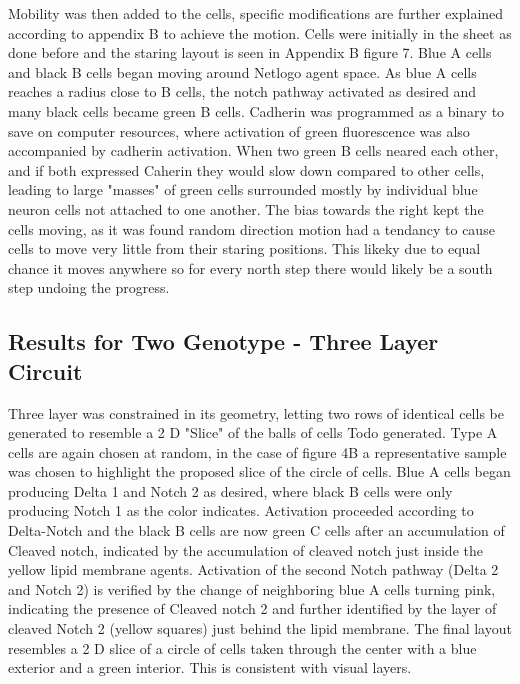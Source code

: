 \documentclass[12pt]{ifacconf}
\begin{document}
Mobility was then added to the cells, specific modifications are further explained according to appendix B to achieve the motion. Cells were initially in the sheet as done before and the staring layout is seen in Appendix B figure 7. Blue A cells and black B cells began moving around Netlogo agent space. As blue A cells reaches a radius close to B cells, the notch pathway activated as desired and many black cells became green B cells. Cadherin was programmed as a binary to save on computer resources, where activation of green fluorescence was also accompanied by cadherin activation. When two green B cells neared each other, and if both expressed Caherin they would slow down compared to other cells, leading to large "masses" of green cells surrounded mostly by individual blue neuron cells not attached to one another. The bias towards the right kept the cells moving, as it was found random direction motion had a tendancy to cause cells to move very little from their staring positions. This likeky due to equal chance it moves anywhere so for every north step there would likely be a south step undoing the progress. 

\subsection{Results for Two Genotype - Three Layer Circuit} 

Three layer was constrained in its geometry, letting two rows of identical cells be generated to resemble a 2 D "Slice" of the balls of cells Todo generated.  Type A cells are again chosen at random, in the case of figure 4B a representative sample was chosen to highlight the proposed slice of the circle of cells. Blue A cells began producing Delta 1 and Notch 2 as desired, where black B cells were only producing Notch 1 as the color indicates. Activation proceeded according to Delta-Notch and the black B cells are now green C cells after an accumulation of Cleaved notch, indicated by the accumulation of cleaved notch just inside the yellow lipid membrane agents. Activation of the second Notch pathway (Delta 2 and Notch 2) is verified by the change of neighboring blue A cells turning pink, indicating the presence of Cleaved notch 2 and further identified by the layer of cleaved Notch 2 (yellow squares) just behind the lipid membrane. The final layout resembles a 2 D slice of a circle of cells taken through the center with a blue exterior and a green interior. This is consistent with \cite{TP:18} visual layers.
\end{document}

